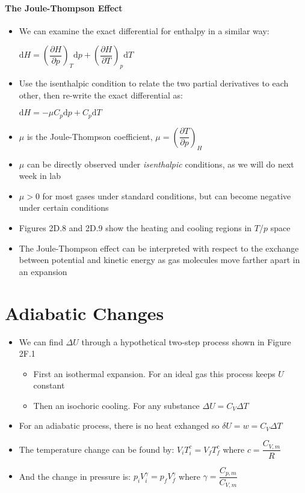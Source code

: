 \documentclass[12pt, openany, letterpaper]{memoir}
\begin{document}
\paragraph{The Joule-Thompson Effect}
\begin{itemize}
	\item We can examine the exact differential for enthalpy in a similar way:

	      $\mathrm{d}H = \left(\dfrac{\partial H}{\partial p}\right)_T\mathrm{d}p + \left(\dfrac{\partial H}{\partial T}\right)_p\mathrm{d}T$
	\item Use the isenthalpic condition to relate the two partial derivatives to each other, then re-write the exact differential as:

	      $\mathrm{d}H = -\mu C_p\mathrm{d}p + C_p\mathrm{d}T$
	\item $\mu$ is the Joule-Thompson coefficient, $\mu = \left(\dfrac{\partial T}{\partial p}\right)_H$
	\item $\mu$ can be directly observed under \emph{isenthalpic} conditions, as we will do next week in lab
	\item $\mu > 0$ for most gases under standard conditions, but can become negative under certain conditions
	\item Figures 2D.8 and 2D.9 show the heating and cooling regions in $T$/$p$ space
	\item The Joule-Thompson effect can be interpreted with respect to the exchange between potential and kinetic energy as gas molecules move farther apart in an expansion
\end{itemize}

\section{Adiabatic Changes}
\begin{itemize}
	\item We can find $\Delta U$ through a hypothetical two-step process shown in Figure 2F.1
	      \begin{itemize}
		      \item First an isothermal expansion. For an ideal gas this process keeps $U$ constant
		      \item Then an isochoric cooling. For any substance $\Delta U = C_V\Delta T$
	      \end{itemize}
	\item For an adiabatic process, there is no heat exhanged so $\delta U = w = C_V\Delta T$
	\item The temperature change can be found by: $V_iT_i^c = V_fT_f^c$ where $c=\dfrac{C_{V,m}}{R}$
	\item And the change in pressure is: $p_iV_i^\gamma=p_fV_f^\gamma$ where $\gamma = \dfrac{C_{p,m}}{C_{V,m}}$
\end{itemize}
\end{document}
